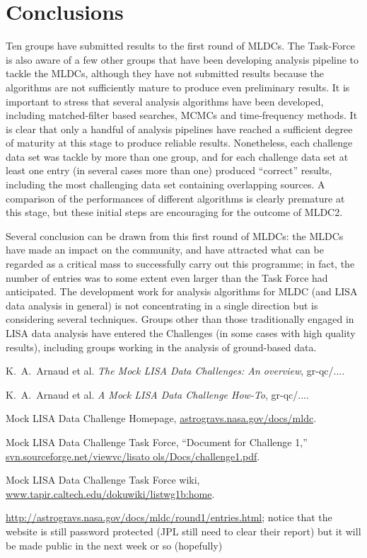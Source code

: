 \documentclass[11pt]{article}
\begin{document}
\section{Conclusions}

Ten groups have submitted results to the first round of MLDCs. The Task-Force is also aware of a few other groups that have been developing analysis pipeline to tackle the MLDCs, although they have not submitted results because the algorithms are not sufficiently mature to produce even preliminary results. It is important to stress that several analysis algorithms have been developed, including matched-filter based searches, MCMCs and time-frequency methods. It is clear that only a handful of analysis pipelines have reached a sufficient degree of maturity at this stage to produce reliable results. Nonetheless, each challenge data set was tackle by more than one group, and for each challenge data set at least one entry (in several cases more than one) produced ``correct'' results, including the most challenging data set containing overlapping sources. A comparison of the performances of different algorithms is clearly premature at this stage, but these initial steps are encouraging for the outcome of MLDC2.

Several conclusion can be drawn from this first round of MLDCs: the MLDCs have made an impact on the community, and  have attracted what can be regarded as a critical mass to successfully carry out this programme; in fact, the number of entries was to some extent even larger than the Task Force had anticipated. The development work for analysis algorithms for MLDC (and LISA data analysis in general) is not concentrating in a single direction but is considering several techniques. Groups other than those traditionally engaged in LISA data analysis have entered the Challenges (in some cases with high quality results), including groups working in the analysis of ground-based data. 



\begin{thebibliography}{99}

 K.~A.~Arnaud et al. \emph{The Mock LISA Data Challenges: An overview}, gr-qc/....

 K.~A.~Arnaud et al. \emph{A Mock LISA Data Challenge How-To}, gr-qc/....

 Mock LISA Data Challenge Homepage, \url{astrogravs.nasa.gov/docs/mldc}.

 Mock LISA Data Challenge Task Force, ``Document for Challenge 1,'' \url{svn.sourceforge.net/viewvc/lisato
ols/Docs/challenge1.pdf}.

 Mock LISA Data Challenge Task Force wiki, \url{www.tapir.caltech.edu/dokuwiki/listwg1b:home}.

 \url{http://astrogravs.nasa.gov/docs/mldc/round1/entries.html}; notice that the website is still password protected (JPL still need to clear their report) but it will be made public in the next week or so (hopefully)

\end{thebibliography}
\end{document}
